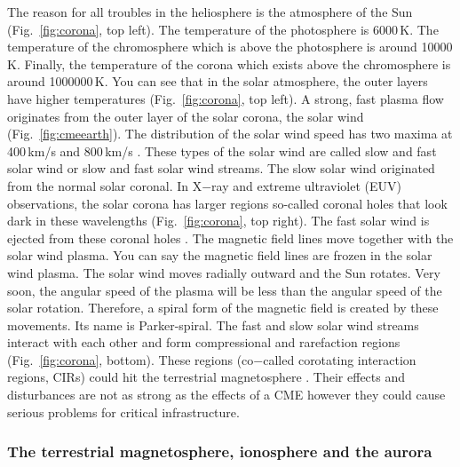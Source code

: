 \documentclass[sn-aps]{sn-jnl}%
\begin{document}
The reason for all troubles in the heliosphere is the atmosphere of the Sun (Fig.~\ref{fig:corona}, top left). The temperature of the photosphere is 6000\,K. The temperature of the chromosphere which is above the photosphere is around 10000\,K. Finally, the temperature of the corona which exists above the chromosphere is around 1000000\,K. You can see that in the solar atmosphere, the outer layers have higher temperatures (Fig.~\ref{fig:corona}, top left). A strong, fast plasma flow originates from the outer layer of the solar corona, the solar wind (Fig.~\ref{fig:cmeearth}). The distribution of the solar wind speed has two maxima at 400\,km/s and 800\,km/s \cite{mccomas98:_ulyss}. These types of the solar wind are called slow and fast solar wind or slow and fast solar wind streams. The slow solar wind originated from the normal solar coronal. In X$-$ray and extreme ultraviolet (EUV) observations, the solar corona has larger regions so-called coronal holes that look dark in these wavelengths (Fig.~\ref{fig:corona}, top right). The fast solar wind is ejected from these coronal holes \cite{scherer05:_space_weath,stix04:_sun_introd}. The magnetic field lines move together with the solar wind plasma. You can say the magnetic field lines are frozen in the solar wind plasma. The solar wind moves radially outward and the Sun rotates. Very soon, the angular speed of the plasma will be less than the angular speed of the solar rotation. Therefore, a spiral form of the magnetic field is created by these movements. Its name is Parker-spiral. The fast and slow solar wind streams interact with each other and form compressional and rarefaction regions (Fig.~\ref{fig:corona}, bottom). These regions (co$-$called corotating interaction regions, CIRs) could hit the terrestrial magnetosphere \cite{scherer05:_space_weath}. Their effects and disturbances are not as strong as the effects of a CME however they could cause serious problems for critical infrastructure. 

\subsubsection{The terrestrial magnetosphere, ionosphere and the aurora}
\label{sec:magn}
\end{document}

